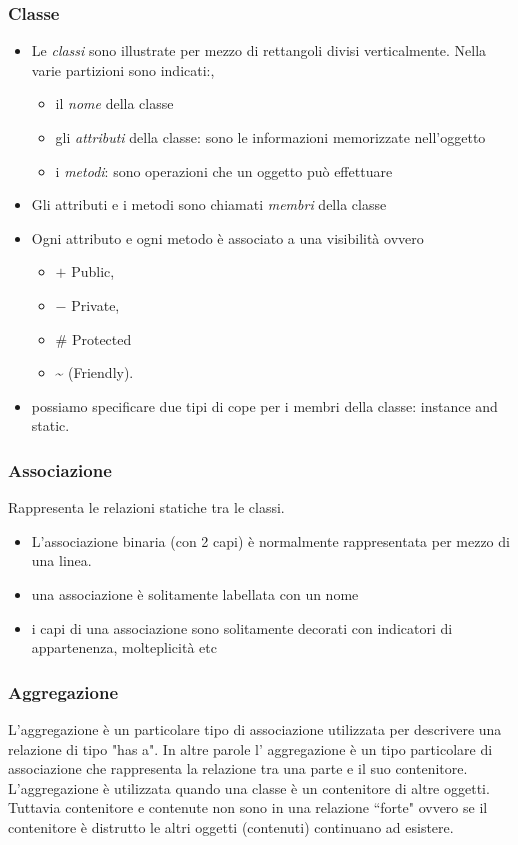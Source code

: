 \documentclass{article}
\begin{document}
\subsubsection{Classe}
\begin{itemize}
\item  Le \textit{classi} sono illustrate per mezzo di rettangoli divisi verticalmente. Nella varie partizioni sono indicati:,
\begin{itemize}
\item il \emph{nome} della classe
\item gli \emph{attributi} della classe: sono le informazioni memorizzate nell'oggetto
\item i \emph{metodi}: sono operazioni che un oggetto pu\`o effettuare
\end{itemize}
\item Gli attributi e i metodi sono chiamati \emph{membri} della classe 
\item Ogni attributo e ogni metodo \`e associato a una visibilit\`a ovvero
\begin{itemize}
\item  $+$ Public,
\item  $-$ Private,
\item $\#$ Protected
\item  \~{} (Friendly).
\end{itemize}
\item possiamo specificare due tipi di cope per i membri della classe: instance and static.
\end{itemize}


\subsubsection{Associazione}
Rappresenta le relazioni statiche tra le classi. 
\begin{itemize}
\item L'associazione binaria (con 2 capi) \`e normalmente rappresentata per mezzo di una linea.
\item una associazione \`e solitamente labellata con un nome
\item i capi di una associazione sono solitamente decorati con indicatori di appartenenza, molteplicit\`a etc
\end{itemize}

\subsubsection{Aggregazione}
L'aggregazione \`e un particolare tipo di associazione utilizzata per descrivere una relazione di tipo "has a". In altre parole l' aggregazione \`e un tipo particolare di associazione che rappresenta la relazione tra una parte e il suo contenitore. L'aggregazione \`e utilizzata quando una classe \`e un contenitore di altre oggetti. Tuttavia contenitore e contenute non sono in una relazione ``forte" ovvero se il contenitore \`e distrutto le altri oggetti (contenuti) continuano ad esistere.
\end{document}

